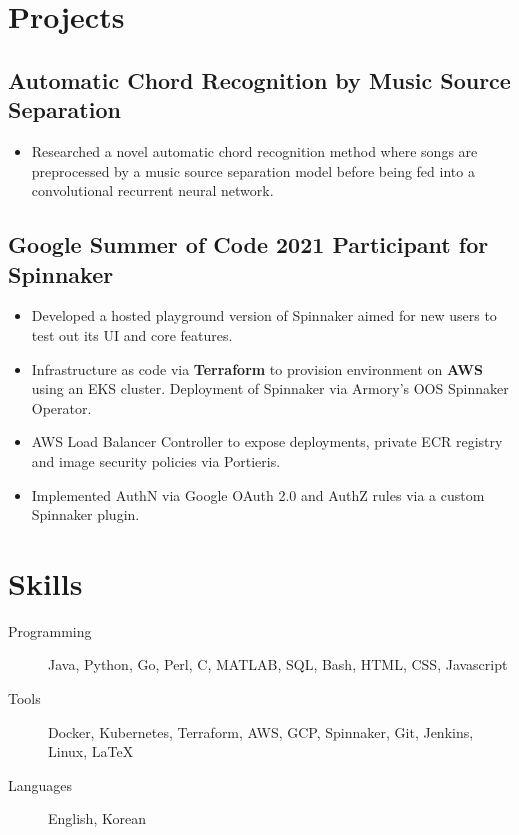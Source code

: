 \documentclass{mycv}
\begin{document}
\section{Projects}

%
\subsection{Automatic Chord Recognition by Music Source Separation
 \href{https://ko28.github.io/chord-transcription/}{
}
}
\begin{itemize}
  \item {
    Researched a novel automatic chord recognition method where songs are preprocessed by a music source separation model before being fed into a convolutional recurrent neural network. 
  }
\iffalse
\item{
Experiments have showed that the model trained with song computed from music source separation performed similar on average compared to a model trained on the original dataset.
}
\fi 
 \end{itemize}


\subsection{Google Summer of Code 2021 Participant for Spinnaker\
    \href{https://github.com/spinnaker/try.spinnaker.io}{}
}
\begin{itemize}
  \item {
    Developed a hosted playground version of Spinnaker aimed for new users to test out its UI and core features.
  }
 \item{
 Infrastructure as code via \textbf{Terraform} to provision environment on \textbf{AWS} using an EKS cluster. Deployment of Spinnaker via Armory's OOS Spinnaker Operator.
 }
 \item{
 AWS Load Balancer Controller to expose deployments, private ECR registry and image security policies via Portieris. 
}
\item{
    Implemented AuthN via Google OAuth 2.0 and AuthZ rules via a custom Spinnaker plugin.
}
 \end{itemize}
\section{Skills}
\begin{description}
  \item[Programming] Java, Python, Go, Perl, C, MATLAB, SQL, Bash, HTML, CSS, Javascript
  \item[Tools] Docker, Kubernetes, Terraform, AWS, GCP, Spinnaker, Git, Jenkins, Linux, \LaTeX 
  \item[Languages] English, Korean
\end{description}
\iffalse
\end{document}
